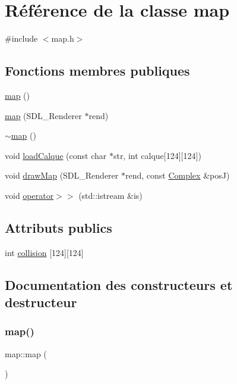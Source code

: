 \hypertarget{classmap}{}\section{Référence de la classe map}
\label{classmap}


{\ttfamily \#include $<$map.\+h$>$}

\subsection*{Fonctions membres publiques}
\begin{DoxyCompactItemize}
\item 
\hyperlink{classmap_abedfe6722ad83929739afd899c88fea4}{map} ()
\item 
\hyperlink{classmap_ac9ca42e594534695586ba202a7e802da}{map} (S\+D\+L\+\_\+\+Renderer $\ast$rend)
\item 
\hyperlink{classmap_a0cc22df7b44f7835fa10ed241848b041}{$\sim$map} ()
\item 
void \hyperlink{classmap_ad2606d243008ce663393b272d01e1463}{load\+Calque} (const char $\ast$str, int calque\mbox{[}124\mbox{]}\mbox{[}124\mbox{]})
\item 
void \hyperlink{classmap_a5ecdf2c5927ddbe3fffb9079fbd3e915}{draw\+Map} (S\+D\+L\+\_\+\+Renderer $\ast$rend, const \hyperlink{classComplex}{Complex} \&posJ)
\item 
void \hyperlink{classmap_a495874310631e8c0b0329984c05b9bd7}{operator$>$$>$} (std\+::istream \&is)
\end{DoxyCompactItemize}
\subsection*{Attributs publics}
\begin{DoxyCompactItemize}
\item 
int \hyperlink{classmap_a4688a2204f0b6301769b4363be830184}{collision} \mbox{[}124\mbox{]}\mbox{[}124\mbox{]}
\end{DoxyCompactItemize}


\subsection{Documentation des constructeurs et destructeur}
\mbox{\label{classmap_abedfe6722ad83929739afd899c88fea4}} 
\subsubsection{\texorpdfstring{map()}{map()}\hspace{0.1cm}{\footnotesize\ttfamily [1/2]}}
{\footnotesize\ttfamily map\+::map (\begin{DoxyParamCaption}{ }\end{DoxyParamCaption})}

